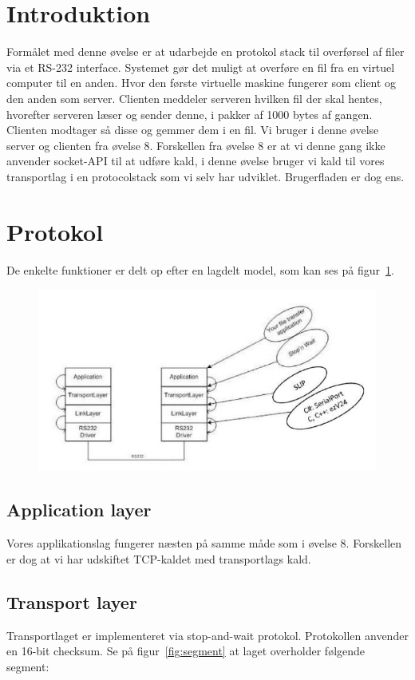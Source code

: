 \section{Introduktion}
Formålet med denne øvelse er at udarbejde en protokol stack til overførsel af filer via et RS-232 interface.
Systemet gør det muligt at overføre en fil fra en virtuel computer til en anden. Hvor den første virtuelle
maskine fungerer som client og den anden som server.
Clienten meddeler serveren hvilken fil der skal hentes, hvorefter serveren læser og sender denne, i pakker
af 1000 bytes af gangen. Clienten modtager så disse og gemmer dem i en fil.
Vi bruger i denne øvelse server og clienten fra øvelse 8. Forskellen fra øvelse 8 er at vi denne gang ikke
anvender socket-API til at udføre kald, i denne øvelse bruger vi kald til vores transportlag i en protocolstack som vi selv har udviklet. Brugerfladen er dog ens.

\section{Protokol}
De enkelte funktioner er delt op efter en lagdelt model, som kan ses på figur~\ref{fig:layers}.

\begin{figure}[H]
	\centering
	\includegraphics[width=\linewidth]{figs/layers}
	\caption{}
	\label{fig:layers}
\end{figure}

\subsection{Application layer}
Vores applikationslag fungerer næsten på samme måde som i øvelse 8. Forskellen er dog at vi har udskiftet
TCP-kaldet med transportlags kald.

\subsection{Transport layer}
Transportlaget er implementeret via stop-and-wait protokol. Protokollen anvender en 16-bit checksum.
Se på figur~\ref{fig:segment} at laget overholder følgende segment:


